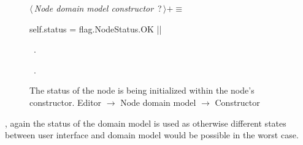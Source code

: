 \documentclass[%
    a4paper,    %
    justified,  %
    nobib,      %
    openany     %
]{tufte-book}
\begin{document}
\begin{figure}
\begin{flushleft} \small
\begin{minipage}{\linewidth}\label{scrap76}\raggedright\small
{} $\langle\,${\itshape Node domain model constructor}\nobreak\ {\footnotesize {?}}$\,\rangle+\equiv$
\vspace{-1ex}
\begin{pythoncode}
    self.status = flag.NodeStatus.OK
|\NWsep|
\end{pythoncode}
\vspace{1.5ex}
\footnotesize
\begin{list}{}{\setlength{\itemsep}{-\parsep}\setlength{\itemindent}{-\leftmargin}}
\item \NWtxtMacroDefBy\ .
\item \NWtxtMacroRefIn\ .

\item{}
\end{list}
\end{minipage}\vspace{4ex}
\end{flushleft}
\caption{The status of the node is being initialized within the node's constructor.
  \newline{}\newline{}Editor $\rightarrow$ Node domain model $\rightarrow$
  Constructor}
\label{editor:lst:node-domain-model:constructor:status}
\end{figure}

, again the status of the domain model is
used as otherwise different states between user interface and domain model would
be possible in the worst case.
\end{document}

